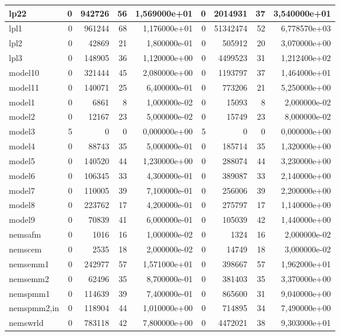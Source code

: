 \begin{tabular}{|l|r|r|r|r|r|r|r|r|}
lp22 & 0 & 942726 & 56 & 1,569000e+01 & 0 & 2014931 & 37 & 3,540000e+01 \\ \hline
lpl1 & 0 & 961244 & 68 & 1,176000e+01 & 0 & 51342474 & 52 & 6,778570e+03 \\ \hline
lpl2 & 0 & 42869 & 21 & 1,800000e-01 & 0 & 505912 & 20 & 3,070000e+00 \\ \hline
lpl3 & 0 & 148905 & 36 & 1,120000e+00 & 0 & 4499523 & 31 & 1,212400e+02 \\ \hline
model10 & 0 & 321444 & 45 & 2,080000e+00 & 0 & 1193797 & 37 & 1,464000e+01 \\ \hline
model11 & 0 & 140071 & 25 & 6,400000e-01 & 0 & 773206 & 21 & 5,250000e+00 \\ \hline
model1 & 0 & 6861 & 8 & 1,000000e-02 & 0 & 15093 & 8 & 2,000000e-02 \\ \hline
model2 & 0 & 12167 & 23 & 5,000000e-02 & 0 & 15749 & 23 & 8,000000e-02 \\ \hline
model3 & 5 & 0 & 0 & 0,000000e+00 & 5 & 0 & 0 & 0,000000e+00 \\ \hline
model4 & 0 & 88743 & 35 & 5,000000e-01 & 0 & 185714 & 35 & 1,320000e+00 \\ \hline
model5 & 0 & 140520 & 44 & 1,230000e+00 & 0 & 288074 & 44 & 3,230000e+00 \\ \hline
model6 & 0 & 106345 & 33 & 4,300000e-01 & 0 & 389087 & 33 & 2,140000e+00 \\ \hline
model7 & 0 & 110005 & 39 & 7,100000e-01 & 0 & 256006 & 39 & 2,200000e+00 \\ \hline
model8 & 0 & 223762 & 17 & 4,200000e-01 & 0 & 275797 & 17 & 1,140000e+00 \\ \hline
model9 & 0 & 70839 & 41 & 6,000000e-01 & 0 & 105039 & 42 & 1,440000e+00 \\ \hline
nemsafm & 0 & 1016 & 16 & 1,000000e-02 & 0 & 1324 & 16 & 2,000000e-02 \\ \hline
nemscem & 0 & 2535 & 18 & 2,000000e-02 & 0 & 14749 & 18 & 3,000000e-02 \\ \hline
nemsemm1 & 0 & 242977 & 57 & 1,571000e+01 & 0 & 398667 & 57 & 1,962000e+01 \\ \hline
nemsemm2 & 0 & 62496 & 35 & 8,700000e-01 & 0 & 381403 & 35 & 3,370000e+00 \\ \hline
nemspmm1 & 0 & 114639 & 39 & 7,400000e-01 & 0 & 865600 & 31 & 9,040000e+00 \\ \hline
nemspmm2,in & 0 & 118904 & 44 & 1,010000e+00 & 0 & 714895 & 34 & 7,490000e+00 \\ \hline
nemswrld & 0 & 783118 & 42 & 7,800000e+00 & 0 & 4472021 & 38 & 9,303000e+01 \\ \hline

\end{tabular}
